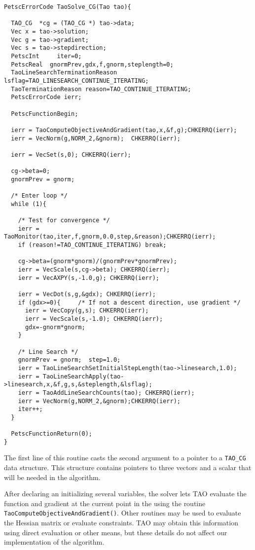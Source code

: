 \begin{verbatim}
PetscErrorCode TaoSolve_CG(Tao tao){

  TAO_CG  *cg = (TAO_CG *) tao->data;
  Vec x = tao->solution;
  Vec g = tao->gradient;
  Vec s = tao->stepdirection;
  PetscInt     iter=0;
  PetscReal  gnormPrev,gdx,f,gnorm,steplength=0;
  TaoLineSearchTerminationReason lsflag=TAO_LINESEARCH_CONTINUE_ITERATING;
  TaoTerminationReason reason=TAO_CONTINUE_ITERATING;
  PetscErrorCode ierr;

  PetscFunctionBegin;

  ierr = TaoComputeObjectiveAndGradient(tao,x,&f,g);CHKERRQ(ierr);
  ierr = VecNorm(g,NORM_2,&gnorm);  CHKERRQ(ierr);

  ierr = VecSet(s,0); CHKERRQ(ierr); 

  cg->beta=0;
  gnormPrev = gnorm;

  /* Enter loop */
  while (1){

    /* Test for convergence */
    ierr = TaoMonitor(tao,iter,f,gnorm,0.0,step,&reason);CHKERRQ(ierr);
    if (reason!=TAO_CONTINUE_ITERATING) break;

    cg->beta=(gnorm*gnorm)/(gnormPrev*gnormPrev);
    ierr = VecScale(s,cg->beta); CHKERRQ(ierr);
    ierr = VecAXPY(s,-1.0,g); CHKERRQ(ierr);
    
    ierr = VecDot(s,g,&gdx); CHKERRQ(ierr);
    if (gdx>=0){     /* If not a descent direction, use gradient */
      ierr = VecCopy(g,s); CHKERRQ(ierr);
      ierr = VecScale(s,-1.0); CHKERRQ(ierr);
      gdx=-gnorm*gnorm;
    } 

    /* Line Search */
    gnormPrev = gnorm;  step=1.0;
    ierr = TaoLineSearchSetInitialStepLength(tao->linesearch,1.0);
    ierr = TaoLineSearchApply(tao->linesearch,x,&f,g,s,&steplength,&lsflag);
    ierr = TaoAddLineSearchCounts(tao); CHKERRQ(ierr);
    ierr = VecNorm(g,NORM_2,&gnorm);CHKERRQ(ierr);
    iter++;
  }
  
  PetscFunctionReturn(0);
}
\end{verbatim}

The first line of this routine casts the second argument to a pointer
to a {\tt TAO\_CG} data structure.  This structure contains pointers
to three vectors and a scalar that will be needed in the algorithm.

After declaring an initializing several variables, the solver lets TAO 
evaluate the function and gradient at the
current point in the using the routine 
{\tt Tao\-Compute\-Objective\-And\-Gradient()}.
Other routines may be used to evaluate the Hessian matrix or evaluate
constraints.  TAO may obtain this information using direct evaluation 
or other means, but these details do not affect our implementation
of the algorithm.

